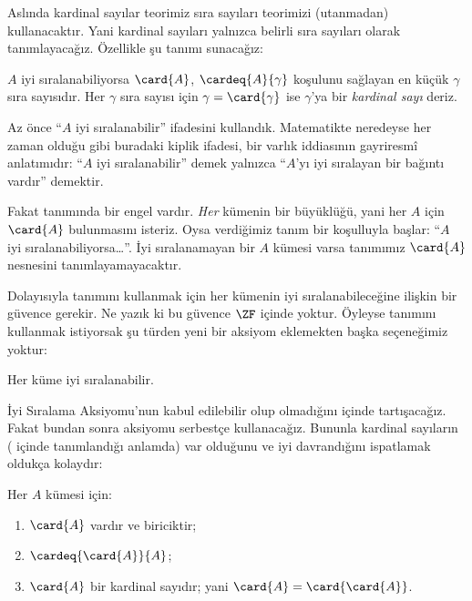 \documentclass[../../../include/open-logic-section]{subfiles}
\begin{document}

Aslında kardinal sayılar teorimiz sıra sayıları teorimizi (utanmadan)
kullanacaktır. Yani kardinal sayıları yalnızca belirli sıra sayıları olarak
tanımlayacağız. Özellikle şu tanımı sunacağız:

\begin{defn}
$A$ iyi sıralanabiliyorsa $\card{A}$, $\cardeq{A}{\gamma}$ koşulunu
sağlayan en küçük $\gamma$ sıra sayısıdır. Her $\gamma$ sıra sayısı için
$\gamma=\card{\gamma}$ ise $\gamma$'ya bir \emph{kardinal sayı} deriz.
\end{defn}

Az önce ``$A$ iyi sıralanabilir'' ifadesini kullandık. Matematikte neredeyse
her zaman olduğu gibi buradaki kiplik ifadesi, bir varlık iddiasının
gayriresmî anlatımıdır: ``$A$ iyi sıralanabilir'' demek yalnızca ``$A$'yı
iyi sıralayan bir bağıntı vardır'' demektir.

Fakat  tanımında bir engel vardır. \emph{Her}
kümenin bir büyüklüğü, yani her $A$ için $\card{A}$ bulunmasını isteriz.
Oysa verdiğimiz tanım bir koşulluyla başlar: ``$A$ iyi
sıralanabiliyorsa\ldots''. İyi sıralanamayan bir $A$ kümesi varsa tanımımız
$\card{A}$ nesnesini tanımlayamayacaktır.

Dolayısıyla  tanımını kullanmak için her kümenin
iyi sıralanabileceğine ilişkin bir güvence gerekir. Ne yazık ki bu güvence
$\ZF$ içinde yoktur. Öyleyse  tanımını
kullanmak istiyorsak şu türden yeni bir aksiyom eklemekten başka seçeneğimiz
yoktur:
\begin{axiom}
Her küme iyi sıralanabilir.
\end{axiom}
İyi Sıralama Aksiyomu'nun kabul edilebilir olup olmadığını
 içinde tartışacağız. Fakat bundan sonra aksiyomu
serbestçe kullanacağız. Bununla kardinal sayıların
( içinde tanımlandığı anlamda) var olduğunu ve
iyi davrandığını ispatlamak oldukça kolaydır:

\begin{lem}
Her $A$ kümesi için:
\begin{enumerate}
	\item{} $\card{A}$ vardır ve biriciktir;
	\item{} $\cardeq{\card{A}}{A}$;
	\item{} $\card{A}$ bir kardinal sayıdır; yani
	$\card{A}=\card{\card{A}}$.
\end{enumerate}
\end{lem}
\end{document}
